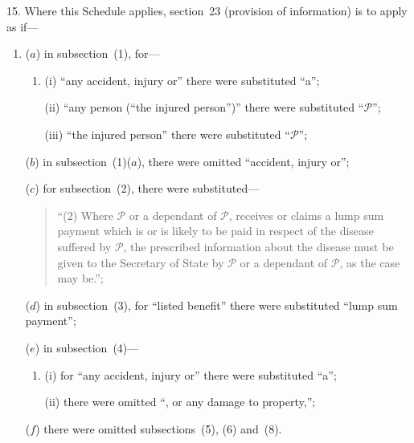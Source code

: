 \documentclass[12pt,a4paper]{article}
\begin{document}
15.  Where this Schedule applies, section~23 (provision of information) is to apply as if—
\begin{enumerate}\item[]
($a$) in subsection~(1), for—
\begin{enumerate}\item[]
(i) “any accident, injury or” there were substituted “a”;

(ii) “any person (“the injured person”)” there were substituted “$\mathcal{P}$”;

(iii) “the injured person” there were substituted “$\mathcal{P}$”;
\end{enumerate}

($b$) in subsection~(1)($a$), there were omitted “accident, injury or”;

($c$) for subsection~(2), there were substituted—
\begin{quotation}
“(2) Where $\mathcal{P}$ or a dependant of $\mathcal{P}$, receives or claims a lump sum payment which is or is likely to be paid in respect of the disease suffered by $\mathcal{P}$, the prescribed information about the disease must be given to the Secretary of State by $\mathcal{P}$ or a dependant of $\mathcal{P}$, as the case may be.”;
\end{quotation}

($d$) in subsection~(3), for “listed benefit” there were substituted “lump sum payment”;

($e$) in subsection~(4)—
\begin{enumerate}\item[]
(i) for “any accident, injury or” there were substituted “a”;

(ii) there were omitted “, or any damage to property,”;
\end{enumerate}

($f$) there were omitted subsections~(5), (6) and~(8).
\end{enumerate}

\medskip
\end{document}
